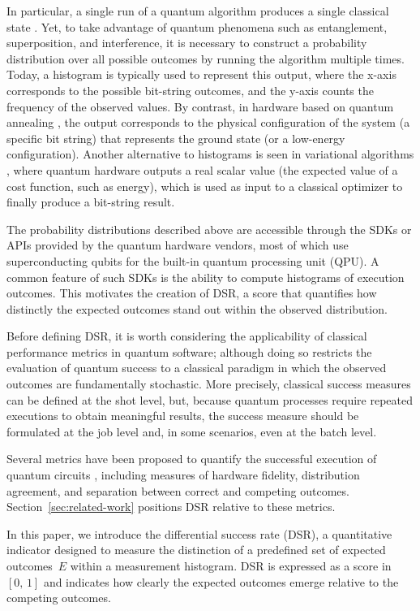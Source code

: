 \documentclass[pdflatex,sn-mathphys-num]{sn-jnl}
\theoremstyle{thmstyleone}%
\theoremstyle{thmstyletwo}%
\theoremstyle{thmstylethree}%
\begin{document}
In particular, a single run of a quantum algorithm produces a single classical state \cite{nielsenQuantumComputationQuantuma_2010}. Yet, to take advantage of quantum phenomena such as entanglement, superposition, and interference, it is necessary to construct a probability distribution over all possible outcomes by running the algorithm multiple times. Today, a histogram is typically used to represent this output, where the x-axis corresponds to the possible bit-string outcomes, and the y-axis counts the frequency of the observed values. By contrast, in hardware based on quantum annealing \cite{Hauke_2020_2020}, the output corresponds to the physical configuration of the system (a specific bit string) that represents the ground state (or a low-energy configuration). Another alternative to histograms is seen in variational algorithms \cite{McClean_2016_2016}, where quantum hardware outputs a real scalar value (the expected value of a cost function, such as energy), which is used as input to a classical optimizer to finally produce a bit-string result.

The probability distributions described above are accessible through the SDKs or APIs provided by the quantum hardware vendors, most of which use superconducting qubits for the built-in quantum processing unit (QPU). A common feature of such SDKs is the ability to compute histograms of execution outcomes. This motivates the creation of DSR, a score that quantifies how distinctly the expected outcomes stand out within the observed distribution.

Before defining DSR, it is worth considering the applicability of classical performance metrics in quantum software; although doing so restricts the evaluation of quantum success to a classical paradigm in which the observed outcomes are fundamentally stochastic. More precisely, classical success measures can be defined at the shot level, but, because quantum processes require repeated executions to obtain meaningful results, the success measure should be formulated at the job level and, in some scenarios, even at the batch level.

Several metrics have been proposed to quantify the successful execution of quantum circuits \cite{mohapatraBenchmarkingFidelityMetrics_2025}, including measures of hardware fidelity, distribution agreement, and separation between correct and competing outcomes. Section~\ref{sec:related-work} positions DSR relative to these metrics.

In this paper, we introduce the differential success rate (DSR), a quantitative indicator designed to measure the distinction of a predefined set of expected outcomes~$E$ within a measurement histogram. DSR is expressed as a score in $[0,\,1]$ and indicates how clearly the expected outcomes emerge relative to the competing outcomes.
\end{document}
